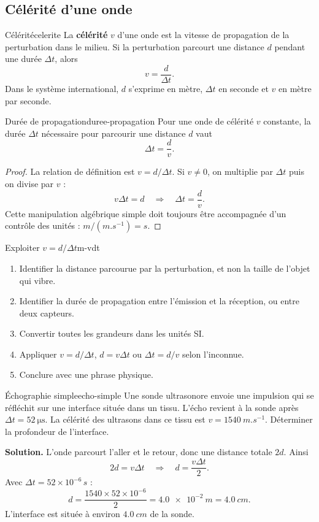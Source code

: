 \documentclass[11pt,a4paper]{article}
\begin{document}
\subsection{Célérité d'une onde}

\begin{definitionbox}{Célérité}{celerite}
La \textbf{célérité} $v$ d'une onde est la vitesse de propagation de la perturbation dans le milieu. Si la perturbation parcourt une distance $d$ pendant une durée $\Delta t$, alors
\[
\boxed{v=\frac{d}{\Delta t}}.
\]
Dans le système international, $d$ s'exprime en mètre, $\Delta t$ en seconde et $v$ en mètre par seconde.
\end{definitionbox}

\begin{propositionbox}{Durée de propagation}{duree-propagation}
Pour une onde de célérité $v$ constante, la durée $\Delta t$ nécessaire pour parcourir une distance $d$ vaut
\[
\boxed{\Delta t=\frac{d}{v}}.
\]
\end{propositionbox}

\begin{proof}
La relation de définition est $v=d/\Delta t$. Si $v\neq 0$, on multiplie par $\Delta t$ puis on divise par $v$ :
\[
v\Delta t=d \quad \Longrightarrow \quad \Delta t=\frac{d}{v}.
\]
Cette manipulation algébrique simple doit toujours être accompagnée d'un contrôle des unités : $\si{m}/(\si{m.s^{-1}})=\si{s}$.
\end{proof}

\begin{methodbox}{Exploiter $v=d/\Delta t$}{m-vdt}
\begin{enumerate}[label=\arabic*)]
  \item Identifier la distance parcourue par la perturbation, et non la taille de l'objet qui vibre.
  \item Identifier la durée de propagation entre l'émission et la réception, ou entre deux capteurs.
  \item Convertir toutes les grandeurs dans les unités SI.
  \item Appliquer $v=d/\Delta t$, $d=v\Delta t$ ou $\Delta t=d/v$ selon l'inconnue.
  \item Conclure avec une phrase physique.
\end{enumerate}
\end{methodbox}

\begin{examplebox}{Échographie simple}{echo-simple}
Une sonde ultrasonore envoie une impulsion qui se réfléchit sur une interface située dans un tissu. L'écho revient à la sonde après $\Delta t=\SI{52}{\micro\second}$. La célérité des ultrasons dans ce tissu est $v=\SI{1540}{m.s^{-1}}$. Déterminer la profondeur de l'interface.

\textbf{Solution.} L'onde parcourt l'aller et le retour, donc une distance totale $2d$. Ainsi
\[
2d=v\Delta t \quad \Longrightarrow \quad d=\frac{v\Delta t}{2}.
\]
Avec $\Delta t=52\times 10^{-6}\,\si{s}$ :
\[
d=\frac{1540\times 52\times 10^{-6}}{2}=\SI{4.0e-2}{m}=\SI{4.0}{cm}.
\]
L'interface est située à environ $\SI{4.0}{cm}$ de la sonde.
\end{examplebox}
\end{document}
